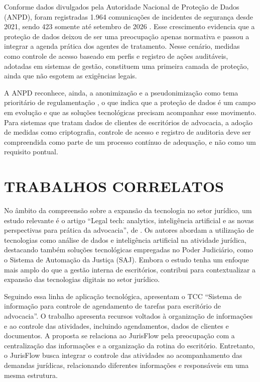 Conforme dados divulgados pela Autoridade Nacional de Proteção de Dados (ANPD), foram registradas 1.964 comunicações de incidentes de segurança desde 2021, sendo 423 somente até setembro de 2026 . Esse crescimento evidencia que a proteção de dados deixou de ser uma preocupação apenas normativa e passou a integrar a agenda prática dos agentes de tratamento. Nesse cenário, medidas como controle de acesso baseado em perfis e registro de ações auditáveis, adotadas em sistemas de gestão, constituem uma primeira camada de proteção, ainda que não esgotem as exigências legais.

A ANPD reconhece, ainda, a anonimização e a pseudonimização como tema prioritário de regulamentação , o que indica que a proteção de dados é um campo em evolução e que as soluções tecnológicas precisam acompanhar esse movimento. Para sistemas que tratam dados de clientes de escritórios de advocacia, a adoção de medidas como criptografia, controle de acesso e registro de auditoria deve ser compreendida como parte de um processo contínuo de adequação, e não como um requisito pontual.

\section{TRABALHOS CORRELATOS}

No âmbito da compreensão sobre a expansão da tecnologia no setor jurídico, um estudo relevante é o artigo ``Legal tech: analytics, inteligência artificial e as novas perspectivas para prática da advocacia'', de . Os autores abordam a utilização de tecnologias como análise de dados e inteligência artificial na atividade jurídica, destacando também soluções tecnológicas empregadas no Poder Judiciário, como o Sistema de Automação da Justiça (SAJ). Embora o estudo tenha um enfoque mais amplo do que a gestão interna de escritórios, contribui para contextualizar a expansão das tecnologias digitais no setor jurídico.

Seguindo essa linha de aplicação tecnológica,  apresentam o TCC ``Sistema de informação para controle de agendamento de tarefas para escritório de advocacia''. O trabalho apresenta recursos voltados à organização de informações e ao controle das atividades, incluindo agendamentos, dados de clientes e documentos. A proposta se relaciona ao JurisFlow pela preocupação com a centralização das informações e a organização da rotina do escritório. Entretanto, o JurisFlow busca integrar o controle das atividades ao acompanhamento das demandas jurídicas, relacionando diferentes informações e responsáveis em uma mesma estrutura.

